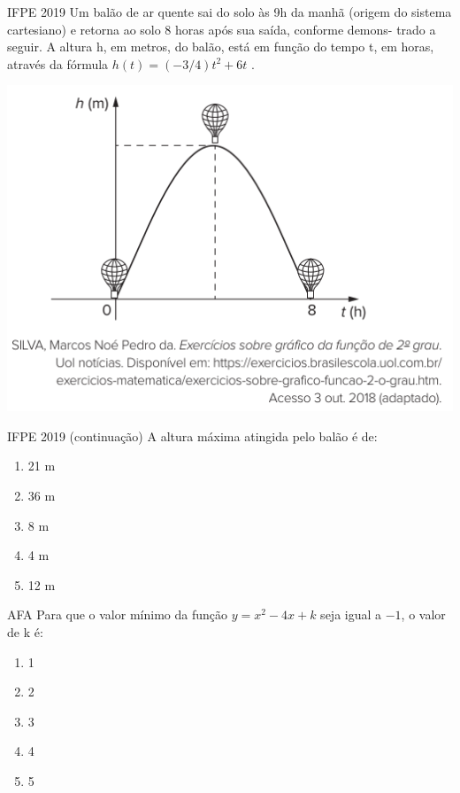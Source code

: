 \documentclass[11pt]{beamer}
\newif\ifgab
\newcommand{\gab}[1]{%
  \ifgab
    \textcolor{red!80!black}{\textbf{#1}}%
  \else
    #1%
  \fi
}
\begin{document}
\begin{frame}{IFPE 2019}
    Um balão de ar quente sai do solo às 9h da manhã (origem do sistema cartesiano) e retorna ao solo 8 horas após sua saída, conforme demons- trado a seguir. A altura h, em metros, do balão, está em função do tempo t, em horas, através da fórmula $h(t)=(-{3}/{4})t^{2}+6t$ .

    \begin{center}
        \includegraphics[scale=0.5]{imagens/IFPE 2019.png}
    \end{center}
\end{frame}

\begin{frame}{IFPE 2019 (continuação)}
    A altura máxima atingida pelo balão é de:

    \begin{enumerate}[a]
        \item \gab{21 m} %
        \item 36 m
        \item 8 m 
        \item 4 m
        \item 12 m
    \end{enumerate}
\end{frame}

\begin{frame}{AFA}
    Para que o valor mínimo da função $y=x^{2}-4x+k$ seja igual a $-1$, o valor de k é:

    \begin{enumerate}[a]
        \item 1
        \item 2
        \item \gab{3} %
        \item 4
        \item 5
    \end{enumerate}
\end{frame}
\end{document}
